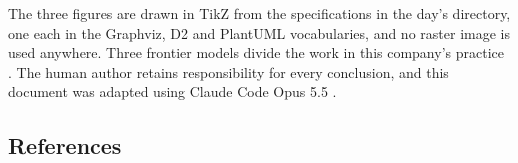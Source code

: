 The three figures are drawn in TikZ from the specifications in the day's
 directory, one each in the Graphviz, D2 and PlantUML
vocabularies, and no raster image is used anywhere. Three frontier models divide
the work in this company's practice \cite{tripartisan2026}. The human author
retains responsibility for every conclusion, and this document was adapted using
Claude Code Opus 5.5 \cite{repo2026}.

\subsection{References}

\begin{apprefs}
\nocite{*}


\end{apprefs}

